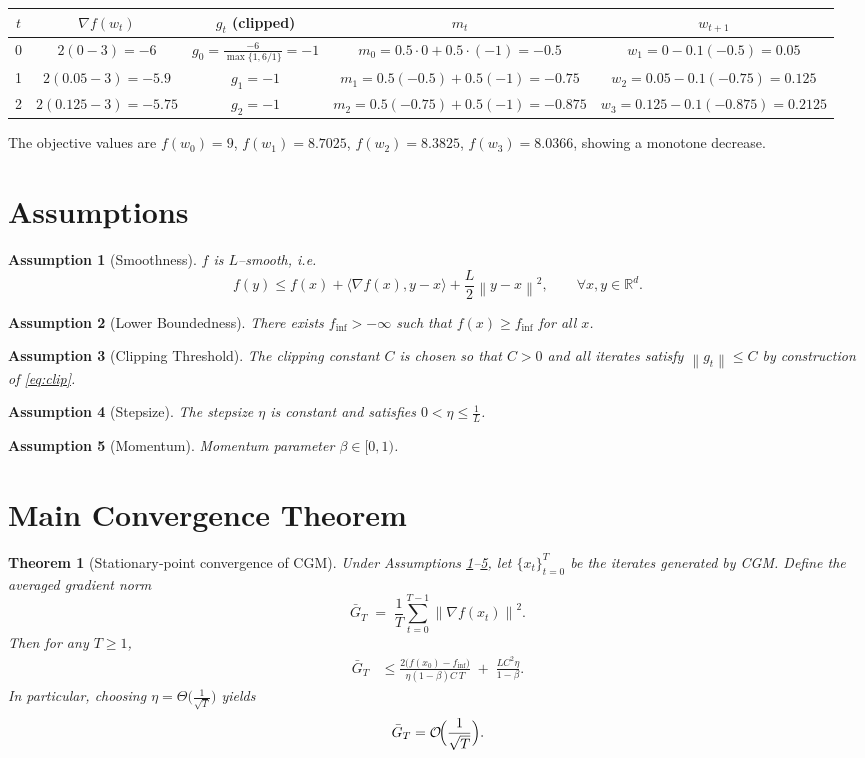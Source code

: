\documentclass{article}
\newtheorem{theorem}{Theorem}
\newtheorem{assumption}{Assumption}
\newcommand{\norm}[1]{\left\lVert #1 \right\rVert}
\begin{document}
\begin{center}
\begin{tabular}{c|c|c|c|c}
$t$ & $\nabla f(w_t)$ & $g_t$ (clipped) & $m_t$ & $w_{t+1}$ \\ \hline
0 & $2(0-3)=-6$ & $g_0=\frac{-6}{\max\{1,6/1\}}=-1$ & $m_0=0.5\cdot0+0.5\cdot(-1)=-0.5$ & $w_1=0-0.1(-0.5)=0.05$ \\[4pt]
1 & $2(0.05-3)=-5.9$ & $g_1=-1$ & $m_1=0.5(-0.5)+0.5(-1)=-0.75$ & $w_2=0.05-0.1(-0.75)=0.125$ \\[4pt]
2 & $2(0.125-3)=-5.75$ & $g_2=-1$ & $m_2=0.5(-0.75)+0.5(-1)=-0.875$ & $w_3=0.125-0.1(-0.875)=0.2125$
\end{tabular}
\end{center}

The objective values are $f(w_0)=9$, $f(w_1)=8.7025$, $f(w_2)=8.3825$, $f(w_3)=8.0366$, showing a monotone decrease.

\newpage
\section*{Assumptions}
\begin{assumption}[Smoothness]\label{as:smooth}
$f$ is $L$–smooth, i.e.
\[
    f(y)\le f(x)+\langle \nabla f(x),y-x\rangle+\frac{L}{2}\norm{y-x}^2,
    \qquad\forall x,y\in\mathbb{R}^d .
\]
\end{assumption}
\begin{assumption}[Lower Boundedness]\label{as:bound}
There exists $f_{\inf}>-\infty$ such that $f(x)\ge f_{\inf}$ for all $x$.
\end{assumption}
\begin{assumption}[Clipping Threshold]\label{as:clip}
The clipping constant $C$ is chosen so that $C>0$ and all iterates satisfy $\norm{g_t}\le C$ by construction of \eqref{eq:clip}.
\end{assumption}
\begin{assumption}[Stepsize]\label{as:step}
The stepsize $\eta$ is constant and satisfies $0<\eta\le \frac{1}{L}$.
\end{assumption}
\begin{assumption}[Momentum]\label{as:beta}
Momentum parameter $\beta\in[0,1)$.
\end{assumption}

\section*{Main Convergence Theorem}
\begin{theorem}[Stationary‑point convergence of CGM]\label{thm:main}
Under Assumptions \ref{as:smooth}–\ref{as:beta}, let $\{x_t\}_{t=0}^T$ be the iterates generated by CGM.
Define the averaged gradient norm
\[
    \bar{G}_T \;=\; \frac{1}{T}\sum_{t=0}^{T-1}\norm{\nabla f(x_t)}^2 .
\]
Then for any $T\ge 1$,
\begin{align}
    \bar{G}_T 
    &\le 
    \frac{2\bigl(f(x_0)-f_{\inf}\bigr)}{\eta(1-\beta)C\,T}
    \;+\;
    \frac{L C^2\eta}{1-\beta}.
    \label{eq:rate}
\end{align}
In particular, choosing $\eta = \Theta\!\bigl(\frac{1}{\sqrt{T}}\bigr)$ yields
\[
    \bar{G}_T = \mathcal{O}\!\Bigl(\frac{1}{\sqrt{T}}\Bigr).
\]
\end{theorem}
\end{document}
